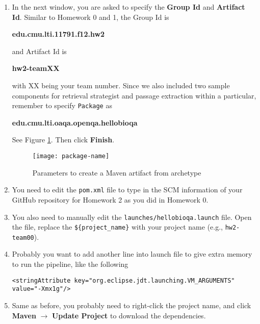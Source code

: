 \begin{enumerate}
\item In the next window, you are asked to specify the \textbf{Group Id} and
\textbf{Artifact Id}. Similar to Homework 0 and 1, the Group Id is

\begin{center}
\textbf{edu.cmu.lti.11791.f12.hw2}
\end{center}

and Artifact Id is

\begin{center}
\textbf{hw2-teamXX}
\end{center}

with XX being your team number. Since we also included two sample components for
retrieval strategist and passage extraction within a particular, remember to
specify \texttt{Package} as

\begin{center}
\textbf{edu.cmu.lti.oaqa.openqa.hellobioqa}
\end{center}

See Figure \ref{fig:package-name}. Then click \textbf{Finish}.

\begin{figure}[t]
\centering
\texttt{[image: package-name]}
\caption{Parameters to create a Maven artifact from archetype\label{fig:package-name}}
\end{figure}

\item You need to edit the \texttt{pom.xml} file to type in the SCM information
of your GitHub repository for Homework 2 as you did in Homework 0.

\item You also need to manually edit the \texttt{launches/hellobioqa.launch}
file. Open the file, replace the \verb|${project_name}| with your project name
(e.g., \verb|hw2-team00|).

\item Probably you want to add another line into launch file to give extra
memory to run the pipeline, like the following

\begin{verbatim}
<stringAttribute key="org.eclipse.jdt.launching.VM_ARGUMENTS" value="-Xmx1g"/>
\end{verbatim}

\item Same as before, you probably need to right-click the project name, and
click \textbf{Maven} $\rightarrow$ \textbf{Update Project} to download the
dependencies.

\end{enumerate}

